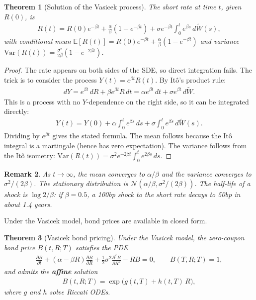 \documentclass{report}
\theoremstyle{spacedplain}
\newtheorem{theorem}{Theorem}[section]
\theoremstyle{spaceddefinition}
\theoremstyle{spacedremark}
\newtheorem{remark}[theorem]{Remark}
\begin{document}
\begin{theorem}[Solution of the Vasicek process]
The short rate at time $t$, given $R(0)$, is
\begin{align}
    R(t) = R(0)e^{-\beta t} + \frac{\alpha}{\beta}(1 - e^{-\beta t}) + \sigma e^{-\beta t}\int_0^t e^{\beta s}\,d\widetilde{W}(s),
\end{align}
with conditional mean $\mathbb{E}[R(t)] = R(0)e^{-\beta t} + \frac{\alpha}{\beta}(1-e^{-\beta t})$ and variance $\text{Var}(R(t)) = \frac{\sigma^2}{2\beta}(1-e^{-2\beta t})$.
\end{theorem}

\begin{proof}
The rate appears on both sides of the SDE, so direct integration fails. The trick is to consider the process $Y(t) = e^{\beta t}R(t)$. By It\^o's product rule:
\begin{align}
    dY = e^{\beta t}\,dR + \beta e^{\beta t}R\,dt = \alpha e^{\beta t}\,dt + \sigma e^{\beta t}\,d\widetilde{W}.
\end{align}
This is a process with no $Y$-dependence on the right side, so it can be integrated directly:
\begin{align}
    Y(t) = Y(0) + \alpha\int_0^t e^{\beta s}\,ds + \sigma\int_0^t e^{\beta s}\,d\widetilde{W}(s).
\end{align}
Dividing by $e^{\beta t}$ gives the stated formula. The mean follows because the It\^o integral is a martingale (hence has zero expectation). The variance follows from the It\^o isometry: $\text{Var}(R(t)) = \sigma^2 e^{-2\beta t}\int_0^t e^{2\beta s}\,ds$.
\end{proof}

\begin{remark}
As $t \to \infty$, the mean converges to $\alpha/\beta$ and the variance converges to $\sigma^2/(2\beta)$. The stationary distribution is $\mathcal{N}(\alpha/\beta, \sigma^2/(2\beta))$. The half-life of a shock is $\log 2/\beta$: if $\beta = 0.5$, a 100bp shock to the short rate decays to 50bp in about 1.4 years.
\end{remark}

Under the Vasicek model, bond prices are available in closed form.

\begin{theorem}[Vasicek bond pricing]
Under the Vasicek model, the zero-coupon bond price $B(t,R;T)$ satisfies the PDE
\begin{align}
    \frac{\partial B}{\partial t} + (\alpha - \beta R)\frac{\partial B}{\partial R} + \frac{1}{2}\sigma^2\frac{\partial^2 B}{\partial R^2} - RB = 0, \qquad B(T,R;T) = 1,
\end{align}
and admits the \textbf{affine} solution
\begin{align}
    B(t,R;T) = \exp\bigl(g(t,T) + h(t,T)\,R\bigr),
\end{align}
where $g$ and $h$ solve Riccati ODEs.
\end{theorem}
\end{document}
